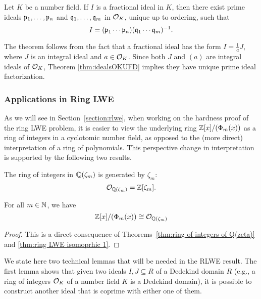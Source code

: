 \documentclass[../main.tex]{subfiles}
\begin{document}
\begin{theorem}
\reversemarginpar
{}
Let $K$ be a number field. If $I$ is a fractional ideal in $K$, then there exist prime ideals $\mathfrak{p}_1, \dots, \mathfrak{p}_n$ and $\mathfrak{q}_1, \dots, \mathfrak{q}_m$ in $\mathcal{O}_K$, unique up to ordering, such that 
\begin{equation*}
    I = (\mathfrak{p}_1 \cdots \mathfrak{p}_n)(\mathfrak{q}_1 \cdots \mathfrak{q}_m)^{-1}.
\end{equation*}
\end{theorem}
The theorem follows from the fact that a fractional ideal has the form $I=\frac{1}{a}J$, where $J$ is an integral ideal and $a \in \mathcal{O}_K$. Since both $J$ and $(a)$ are integral ideals of $\mathcal{O}_K$, Theorem \ref{thm:idealsOKUFD} implies they have unique prime ideal factorization. %


\subsubsection{Applications in Ring LWE}
As we will see in Section~\ref{section:rlwe}, when working on the hardness proof of the ring LWE problem, it is easier to view the underlying ring $\mathbb{Z}[x]/(\Phi_m(x))$ as a ring of integers in a cyclotomic number field, as opposed to the (more direct) interpretation of a ring of polynomials. 
This perspective change in interpretation is supported by the following two results.

\begin{theorem}\label{thm:ring of integers of Q(zeta)}
The ring of integers in $\mathbb{Q}(\zeta_m)$ is generated by $\zeta_m$: 
\[ \mathcal{O}_{\mathbb{Q}(\zeta_m)} = \mathbb{Z}[\zeta_m]. \]
\end{theorem}

\begin{theorem}\label{thm:ring LWE isomoprhic 2}
For all $m\in \mathbb{N}$, we have
\[ \mathbb{Z}[x]/(\Phi_m(x)) \cong \mathcal{O}_{\mathbb{Q}(\zeta_m)} \]
\end{theorem}
\begin{proof}
This is a direct consequence of Theorems~\ref{thm:ring of integers of Q(zeta)} and \ref{thm:ring LWE isomoprhic 1}.
\end{proof}

We state here two technical lemmas that will be needed in the RLWE result. The first lemma shows that given two ideals $I, J \subseteq R$ of a Dedekind domain $R$ (e.g., a ring of integers $\mathcal{O}_K$ of a number field $K$ is a Dedekind domain), it is possible to construct another ideal that is coprime with either one of them. 
\end{document}
